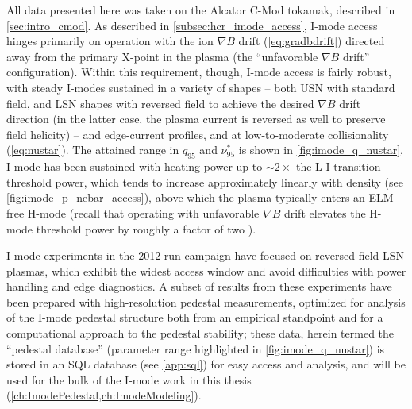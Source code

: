 
All data presented here was taken on the Alcator C-Mod tokamak, described in \cref{sec:intro_cmod}.  As described in \cref{subsec:hcr_imode_access}, I-mode access hinges primarily on operation with the ion $\nabla B$ drift (\cref{eq:gradbdrift}) directed away from the primary X-point in the plasma (the ``unfavorable $\nabla B$ drift'' configuration).  Within this requirement, though, I-mode access is fairly robust, with steady I-modes sustained in a variety of shapes -- both USN with standard field, and LSN shapes with reversed field to achieve the desired $\nabla B$ drift direction (in the latter case, the plasma current is reversed as well to preserve field helicity) -- and edge-current profiles, and at low-to-moderate collisionality (\cref{eq:nustar}).  The attained range in $q_{95}$ and $\nu^*_{95}$ is shown in \cref{fig:imode_q_nustar}.  I-mode has been sustained with heating power up to $\sim 2 \times$ the L-I transition threshold power, which tends to increase approximately linearly with density (see \cref{fig:imode_p_nebar_access}), above which the plasma typically enters an ELM-free H-mode (recall that operating with unfavorable $\nabla B$ drift elevates the H-mode threshold power by roughly a factor of two \cite{Suttrop2003,Carlstrom1998,Groebner1998}).

I-mode experiments in the 2012 run campaign have focused on reversed-field LSN plasmas, which exhibit the widest access window and avoid difficulties with power handling and edge diagnostics.  A subset of results from these experiments have been prepared with high-resolution pedestal measurements, optimized for analysis of the I-mode pedestal structure both from an empirical standpoint and for a computational approach to the pedestal stability; these data, herein termed the ``pedestal database'' (parameter range highlighted in \cref{fig:imode_q_nustar}) is stored in an SQL database (see \cref{app:sql}) for easy access and analysis, and will be used for the bulk of the I-mode work in this thesis (\cref{ch:ImodePedestal,ch:ImodeModeling}).\nicesectionending

